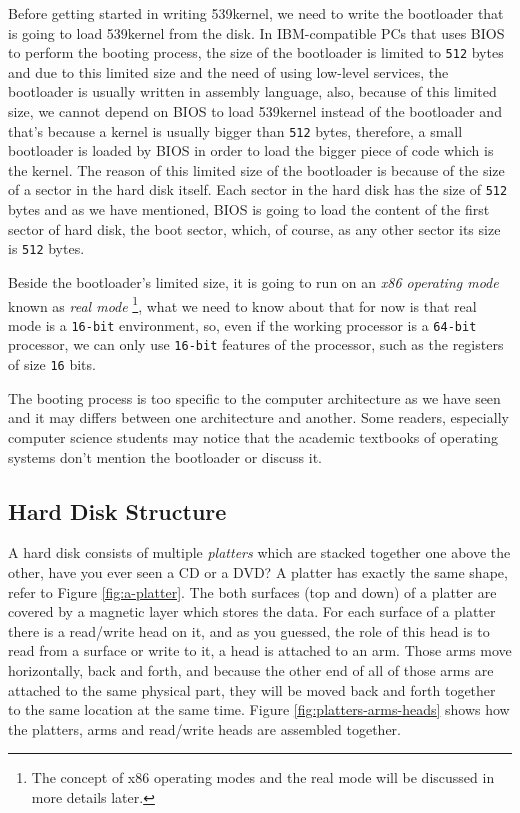 Before getting started in writing 539kernel, we need to write the
bootloader that is going to load 539kernel from the disk. In
IBM-compatible PCs that uses BIOS to perform the booting process, the
size of the bootloader is limited to \lstinline!512! bytes and due to
this limited size and the need of using low-level services, the
bootloader is usually written in assembly language, also, because of
this limited size, we cannot depend on BIOS to load 539kernel instead of
the bootloader and that's because a kernel is usually bigger than
\lstinline!512! bytes, therefore, a small bootloader is loaded by BIOS
in order to load the bigger piece of code which is the kernel. The
reason of this limited size of the bootloader is because of the size of
a sector in the hard disk itself. Each sector in the hard disk has the
size of \lstinline!512! bytes and as we have mentioned, BIOS is going to
load the content of the first sector of hard disk, the boot sector,
which, of course, as any other sector its size is \lstinline!512! bytes.

Beside the bootloader's limited size, it is going to run on an \emph{x86
operating mode} known as \emph{real mode} \footnote{The concept of x86
  operating modes and the real mode will be discussed in more details
  later.}, what we need to know about that for now is that real mode is
a \lstinline!16-bit! environment, so, even if the working processor is a
\lstinline!64-bit! processor, we can only use \lstinline!16-bit!
features of the processor, such as the registers of size \lstinline!16!
bits.

The booting process is too specific to the computer architecture as we
have seen and it may differs between one architecture and another. Some
readers, especially computer science students may notice that the
academic textbooks of operating systems don't mention the bootloader or
discuss it.

\subsection{Hard Disk Structure}\label{hard-disk-structure}

A hard disk consists of multiple \emph{platters} which are stacked
together one above the other, have you ever seen a CD or a DVD? A
platter has exactly the same shape, refer to Figure \ref{fig:a-platter}.
The both surfaces (top and down) of a platter are covered by a magnetic
layer which stores the data. For each surface of a platter there is a
read/write head on it, and as you guessed, the role of this head is to
read from a surface or write to it, a head is attached to an arm. Those
arms move horizontally, back and forth, and because the other end of all
of those arms are attached to the same physical part, they will be moved
back and forth together to the same location at the same time. Figure
\ref{fig:platters-arms-heads} shows how the platters, arms and
read/write heads are assembled together.

